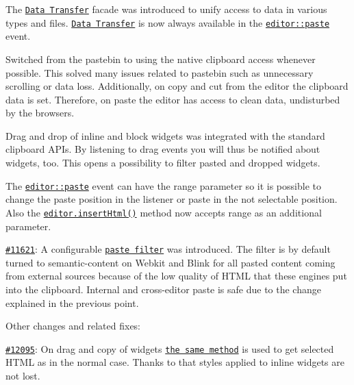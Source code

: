 \begin{DoxyItemize}
\begin{DoxyItemize}
\begin{DoxyItemize}
\item The \href{http://docs.ckeditor.com/#!/api/CKEDITOR.plugins.clipboard.dataTransfer}{\tt Data Transfer} facade was introduced to unify access to data in various types and files. \href{http://docs.ckeditor.com/#!/api/CKEDITOR.plugins.clipboard.dataTransfer}{\tt Data Transfer} is now always available in the \href{http://docs.ckeditor.com/#!/api/CKEDITOR.editor-event-paste}{\tt {\ttfamily editor\+::paste}} event.
\item Switched from the pastebin to using the native clipboard access whenever possible. This solved many issues related to pastebin such as unnecessary scrolling or data loss. Additionally, on copy and cut from the editor the clipboard data is set. Therefore, on paste the editor has access to clean data, undisturbed by the browsers.
\item Drag and drop of inline and block widgets was integrated with the standard clipboard A\+P\+Is. By listening to drag events you will thus be notified about widgets, too. This opens a possibility to filter pasted and dropped widgets.
\item The \href{http://docs.ckeditor.com/#!/api/CKEDITOR.editor-event-paste}{\tt {\ttfamily editor\+::paste}} event can have the {\ttfamily range} parameter so it is possible to change the paste position in the listener or paste in the not selectable position. Also the \href{http://docs.ckeditor.com/#!/api/CKEDITOR.editor-method-insertHtml}{\tt {\ttfamily editor.\+insert\+Html()}} method now accepts {\ttfamily range} as an additional parameter.
\item \href{http://dev.ckeditor.com/ticket/11621}{\tt \#11621}\+: A configurable \href{http://docs.ckeditor.com/#!/api/CKEDITOR.config-cfg-pasteFilter}{\tt paste filter} was introduced. The filter is by default turned to {\ttfamily \textquotesingle{}semantic-\/content\textquotesingle{}} on Webkit and Blink for all pasted content coming from external sources because of the low quality of H\+T\+ML that these engines put into the clipboard. Internal and cross-\/editor paste is safe due to the change explained in the previous point.
\end{DoxyItemize}
\item Other changes and related fixes\+:
\begin{DoxyItemize}
\item \href{http://dev.ckeditor.com/ticket/12095}{\tt \#12095}\+: On drag and copy of widgets \href{http://docs.ckeditor.com/#!/api/CKEDITOR.editor-method-getSelectedHtml}{\tt the same method} is used to get selected H\+T\+ML as in the normal case. Thanks to that styles applied to inline widgets are not lost.

\end{DoxyItemize}
\end{DoxyItemize}
\end{DoxyItemize}
